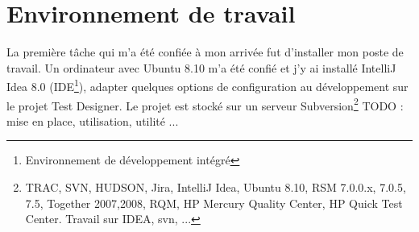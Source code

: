 
\section{Environnement de travail}
La première tâche qui m'a été confiée à mon arrivée fut d'installer mon poste de travail. Un ordinateur avec Ubuntu 8.10 m'a été confié et j'y ai installé IntelliJ Idea 8.0 (IDE\footnote{Environnement de développement intégré}), adapter quelques options de configuration au développement sur le projet Test Designer. Le projet est stocké sur un serveur Subversion\footnote{
TRAC, SVN, HUDSON, Jira, IntelliJ Idea, Ubuntu 8.10, RSM 7.0.0.x, 7.0.5, 7.5, Together 2007,2008, RQM, HP Mercury Quality Center, HP Quick Test Center.
Travail sur IDEA, svn, ...}
TODO : mise en place, utilisation, utilité ...


